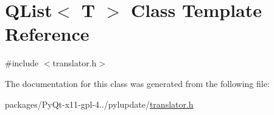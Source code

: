 \hypertarget{classQList}{}\section{Q\+List$<$ T $>$ Class Template Reference}
\label{classQList}


{\ttfamily \#include $<$translator.\+h$>$}



The documentation for this class was generated from the following file\+:\begin{DoxyCompactItemize}
\item 
packages/\+Py\+Qt-\/x11-\/gpl-\/4../pylupdate/\hyperlink{translator_8h}{translator.\+h}\end{DoxyCompactItemize}
